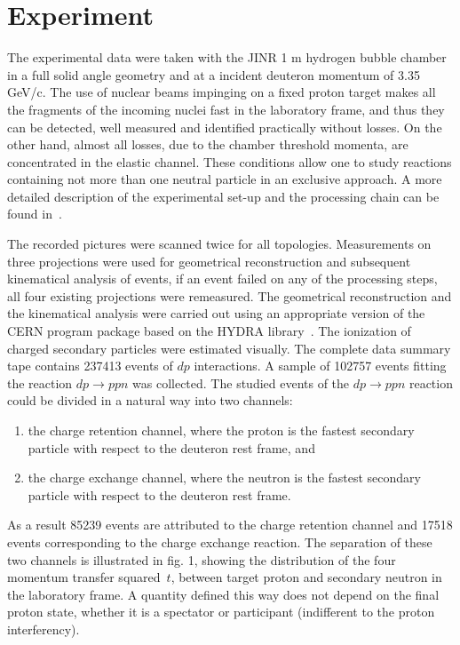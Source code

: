 \documentclass[epj]{svjour}
\begin{document}
\section{Experiment}
The experimental data were taken with the JINR 1 m hydrogen bubble chamber in a
full solid angle geometry and at a incident deuteron momentum of 3.35 GeV/c. The
use of nuclear beams impinging on a fixed proton target makes all the fragments
of the incoming nuclei fast in the laboratory frame, and thus they can be
detected, well measured and identified practically without losses. On the other
hand, almost all losses, due to the chamber threshold momenta, are concentrated
in the elastic channel. These conditions allow one to study reactions containing
not more than one neutral particle in an exclusive approach. A more detailed
description of the experimental set-up and the processing chain can be found
in~\cite{hbc}.

The recorded pictures were scanned twice for all \linebreak
topologies. Measurements on three projections were used for geometrical
reconstruction and subsequent kinematical analysis of events, if an event failed
on any of the processing steps, all four existing projections were
remeasured. The geometrical reconstruction and the kinematical analysis were
carried out using an appropriate version of the CERN program package based on
the HYDRA library~\cite{hyd}. The ionization of charged secondary particles were
estimated visually. The complete data summary tape contains 237413 events of
$dp$ interactions. A sample of 102757 events fitting the reaction $dp\to ppn$
was collected. The studied events of the $dp\to ppn$ reaction could be divided
in a natural way into two channels:
\begin{enumerate}
\item the charge retention channel, where the proton is the fastest secondary
  particle with respect to the deuteron rest frame, and
\item the charge exchange channel, where the neutron is the fastest secondary
  particle with respect to the deuteron rest frame.
\end{enumerate}
As a result 85239 events are attributed to the charge retention channel and
17518 events corresponding to the charge exchange reaction. The separation of
these two channels is illustrated in fig. 1, showing the distribution of the
four momentum transfer squared~$t$, between target proton and secondary neutron
in the laboratory frame. A quantity defined this way does not depend on the
final proton state, whether it is a spectator or participant (indifferent to the
proton interferency).
\end{document}
